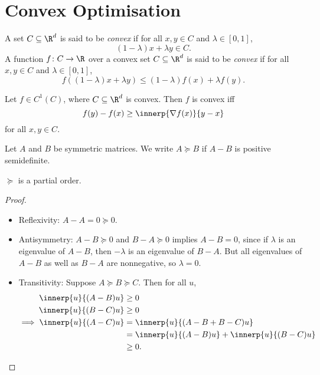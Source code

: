 \chapter{Convex Optimisation} \label{chp:convex}
\begin{definition} \label{def:convex}
    A set $C \subseteq \R^d$ is said to be \emph{convex} if for all
    $x, y \in C$ and $\lambda \in [0, 1]$, \[
        (1-\lambda)x + \lambda y \in C.
    \]
    A function $f\colon C \to \R$ over a convex set $C \subseteq \R^d$ is
    said to be \emph{convex} if for all $x, y \in C$ and
    $\lambda \in [0, 1]$, \[
        f((1-\lambda)x + \lambda y) \le (1-\lambda)f(x) + \lambda f(y).
    \]
\end{definition}

\begin{theorem*}
    Let $f \in C^1(C)$, where $C \subseteq \R^d$ is convex.
    Then $f$ is convex iff \[
        f(y) - f(x) \ge \innerp{\nabla f(x)}{y-x}
    \] for all $x, y \in C$.
\end{theorem*}

\begin{notation}
    Let $A$ and $B$ be symmetric matrices.
    We write $A \succeq B$ if $A - B$ is positive semidefinite.
\end{notation}
\begin{proposition}
    $\succeq$ is a partial order.
\end{proposition}
\begin{proof} \leavevmode
    \begin{itemize}
        \item Reflexivity: $A - A = 0 \succeq 0$.
        \item Antisymmetry: $A - B \succeq 0$ and $B - A \succeq 0$ implies
            $A - B = 0$, since if $\lambda$ is an eigenvalue of $A - B$,
            then $-\lambda$ is an eigenvalue of $B - A$.
            But all eigenvalues of $A - B$ as well as $B - A$ are
            nonnegative, so $\lambda = 0$.
        \item Transitivity: Suppose $A \succeq B \succeq C$.
        Then for all $u$,
        \begin{align*}
            \innerp{u}{(A - B)u} &\ge 0 \\
            \innerp{u}{(B - C)u} &\ge 0 \\
            \implies \innerp{u}{(A - C)u} &= \innerp{u}{(A - B + B - C)u} \\
            &= \innerp{u}{(A - B)u} + \innerp{u}{(B - C)u} \\
            &\ge 0. \qedhere
        \end{align*}
    \end{itemize}
\end{proof}

